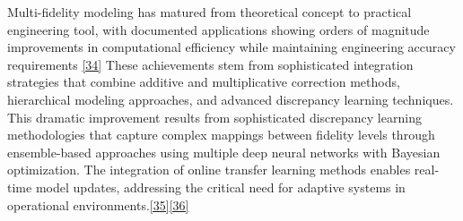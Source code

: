 \documentclass[12pt,a4paper]{report}
\begin{document}
Multi-fidelity modeling has matured from theoretical concept to practical engineering tool, with documented applications showing orders of magnitude improvements in computational efficiency while maintaining engineering accuracy requirements \href{https://doi.org/10.3934/acse.2023015}{[34]}  These achievements stem from sophisticated integration strategies that combine additive and multiplicative correction methods, hierarchical modeling approaches, and advanced discrepancy learning techniques.
 This dramatic improvement results from sophisticated discrepancy learning methodologies that capture complex mappings between fidelity levels through ensemble-based approaches using multiple deep neural networks with Bayesian optimization. The integration of online transfer learning methods enables real-time model updates, addressing the critical need for adaptive systems in operational environments.\href{https://doi.org/10.1016/j.aei.2022.101689}{[35]}\href{http://dx.doi.org/10.3390/ecsa-9-13344}{[36]}
\end{document}
